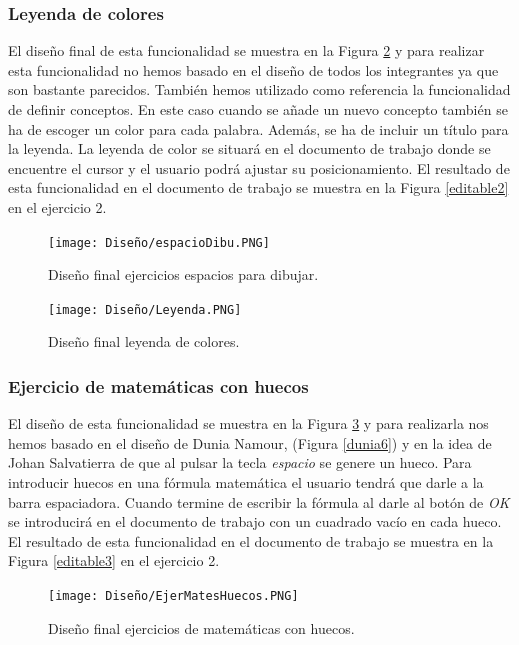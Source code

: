 \subsubsection{Leyenda de colores}
El diseño final de esta funcionalidad se muestra en la Figura \ref{LeyendaColores} y para realizar esta funcionalidad no hemos basado en el diseño de todos los integrantes ya que son bastante parecidos. También hemos utilizado como referencia la funcionalidad de definir conceptos. En este caso cuando se añade un nuevo concepto también se ha de escoger un color para cada palabra. Además, se ha de incluir un título para la leyenda. La leyenda de color se situará en el documento de trabajo donde se encuentre el cursor y el usuario podrá ajustar su posicionamiento. El resultado de esta funcionalidad en el documento de trabajo se muestra en la Figura \ref{editable2} en el ejercicio 2.

\begin{multicols}{2}
  \begin{figure}[H]
    \centering
    \texttt{[image: Diseño/espacioDibu.PNG]}
    \caption{Diseño final ejercicios espacios para dibujar.}
    \label{espaciosDibu}
  \end{figure}
  \begin{figure}[H]
    \centering
    \texttt{[image: Diseño/Leyenda.PNG]}
    \caption{Diseño final leyenda de colores.}
    \label{LeyendaColores}
  \end{figure}
\end{multicols}

\subsubsection{Ejercicio de matemáticas con huecos}
El diseño de esta funcionalidad se muestra en la Figura \ref{matesHueco} y para realizarla nos hemos basado en el diseño de Dunia Namour, (Figura \ref{dunia6}) y en la idea de Johan Salvatierra de que al pulsar la tecla \textit{espacio} se genere un hueco. Para introducir huecos en una fórmula matemática el usuario tendrá que darle a la barra espaciadora. Cuando termine de escribir la fórmula al darle al botón de \textit{OK} se introducirá en el documento de trabajo con un cuadrado vacío en cada hueco. El resultado de esta funcionalidad en el documento de trabajo se muestra en la Figura \ref{editable3} en el ejercicio 2.

\begin{figure}[ht!]
  \centering
  \texttt{[image: Diseño/EjerMatesHuecos.PNG]}
  \caption{Diseño final ejercicios de matemáticas con huecos.}
  \label{matesHueco}
\end{figure}

